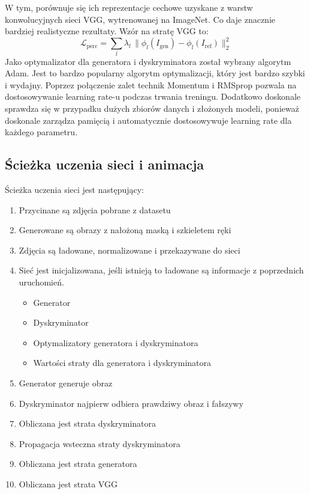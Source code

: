\documentclass[12pt]{article}
\begin{document}
\begin{sloppypar}
{{    W tym, porównuje się ich reprezentacje cechowe uzyskane z warstw konwolucyjnych sieci VGG, wytrenowanej na ImageNet. 
    Co daje znacznie bardziej realistyczne rezultaty. Wzór na stratę VGG to: \\
    \[ \mathcal{L}_{\text{perc}} = \sum_{l} \lambda_l \, \| \phi_l(I_{\text{gen}}) - \phi_l(I_{\text{ref}}) \|_2^2 \]
    Jako optymalizator dla generatora i dyskryminatora został wybrany algorytm Adam. 
    Jest to bardzo popularny algorytm optymalizacji, który jest bardzo szybki i wydajny. Poprzez połączenie zalet technik Momentum i RMSprop pozwala na dostosowywanie learning rate-u podczas trwania treningu. 
    Dodatkowo doskonale sprawdza się w przypadku dużych zbiorów danych i złożonych modeli, ponieważ doskonale zarządza pamięcią i automatycznie dostosowywuje learning rate dla każdego parametru.
  }
  \subsection{Ścieżka uczenia sieci i animacja} \label{flow}
  {
    Ścieżka uczenia sieci jest następujący:
    \begin{enumerate}
      \item Przycinane są zdjęcia pobrane z datasetu \cite{nuzhdin2024hagridv21mimagesstatic}
      \item Generowane są obrazy z nałożoną maską i szkieletem ręki
      \item Zdjęcia są ładowane, normalizowane i przekazywane do sieci
      \item Sieć jest inicjalizowana, jeśli istnieją to ładowane są informacje z poprzednich uruchomień.
      \begin{itemize}
        \item Generator
        \item Dyskryminator
        \item Optymalizatory generatora i dyskryminatora
        \item Wartości straty dla generatora i dyskryminatora
      \end{itemize}
      \item Generator generuje obraz
      \item Dyskryminator najpierw odbiera prawdziwy obraz i fałszywy
      \item Obliczana jest strata dyskryminatora
      \item Propagacja wsteczna straty dyskryminatora
      \item Obliczana jest strata generatora
      \item Obliczana jest strata VGG

\end{enumerate}}}
\end{sloppypar}
\end{document}

